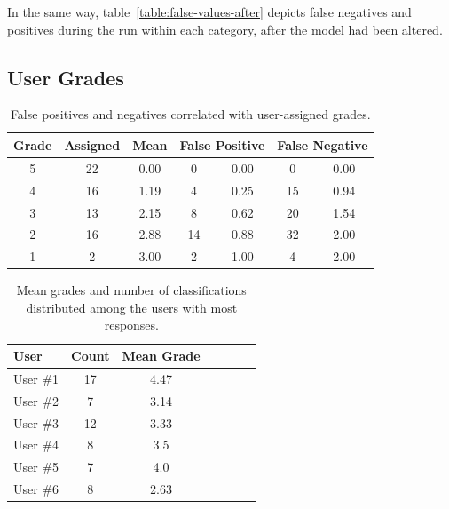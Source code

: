 In the same way, table~\ref{table:false-values-after} depicts false negatives and 
positives during the run within each category, after the model had been altered.

\clearpage

\subsection{User Grades}

\begin{table}
    \centering
    {\begin{tabular}{ | c | c | c | c | c | c | c | }
        \hline
        Grade & Assigned & Mean &
        \multicolumn{2}{|c|}{False Positive} &
        \multicolumn{2}{|c|}{False Negative} \\
        \hline
        5 & 22 & 0.00 & 0  & 0.00  & 0  & 0.00 \\
        4 & 16 & 1.19 & 4  & 0.25  & 15 & 0.94 \\
        3 & 13 & 2.15 & 8  & 0.62  & 20 & 1.54 \\
        2 & 16 & 2.88 & 14 & 0.88  & 32 & 2.00 \\
        1 & 2  & 3.00 & 2  & 1.00  & 4  & 2.00 \\
        \hline
    \end{tabular}}
    \caption{False positives and negatives correlated
        with user-assigned grades. } 
    \label{table:false-values-vs-grades}
\end{table}

\begin{table}
    \centering
    {\begin{tabular}{ | l | c | c | c | c | c | c | }
        \hline
        User & Count & Mean Grade\\
        \hline
        User \#1 & 17 & 4.47 \\
        User \#2 & 7  & 3.14 \\
        User \#3 & 12 & 3.33 \\
        User \#4 & 8  & 3.5  \\
        User \#5 & 7  & 4.0  \\
        User \#6 & 8  & 2.63 \\
        \hline
    \end{tabular}}
    \caption{Mean grades and number of classifications distributed 
        among the users with most responses.} 
    \label{table:user-wise-mean-grade}
\end{table}

